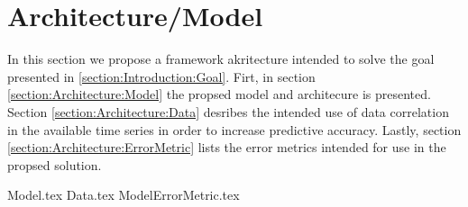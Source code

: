 \chapter{Architecture/Model}
\label{section:Architecture}

In this section we propose a framework akritecture intended to solve the goal presented in \ref{section:Introduction:Goal}.
Firt, in section \ref{section:Architecture:Model} the propsed model and architecure is presented.
Section \ref{section:Architecture:Data} desribes the intended use of data correlation in the available time series in order to increase predictive accuracy.
Lastly, section \ref{section:Architecture:ErrorMetric} lists the error metrics intended for use in the propsed solution. 

{Model.tex}
{Data.tex}
{ModelErrorMetric.tex}


\iffalse
Here you will present the architecture or model that you have chosen and that is (or will be) implemented in your work. Note that putting algorithms in your report is not desirable but in certain cases these might be placed in the appendix. Code further be avoided in the report itself but may be delivered in the fashion requested by the supervisor or, in the case of masters delivery, submitted as additional documents. 
\fi

